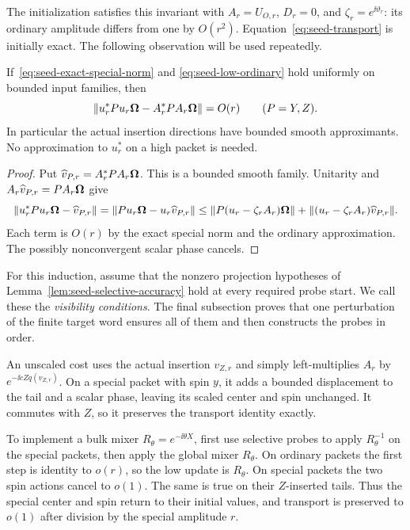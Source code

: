 The initialization satisfies this invariant with \(A_r=U_{O,r}\),
\(D_r=0\), and \(\zeta_r=e^{\ii\vartheta_r}\): its ordinary amplitude
differs from one by \(O(r^2)\).  Equation~\eqref{eq:seed-transport} is
initially exact.  The following observation will be used repeatedly.

\begin{lemma}
\label{lem:seed-low-insertions}
If~\eqref{eq:seed-exact-special-norm} and
\eqref{eq:seed-low-ordinary} hold uniformly on bounded input families,
then
\begin{equation}
\label{eq:seed-insertion-O-r}
 \lVert u_r^*Pu_r\boldsymbol\Omega-A_r^*PA_r\boldsymbol\Omega\rVert=O(r)
 \qquad(P=Y,Z).
\end{equation}
In particular the actual insertion directions have bounded smooth
approximants.  No approximation to \(u_r^*\) on a high packet is needed.
\end{lemma}

\begin{proof}
Put \(\widehat v_{P,r}=A_r^*PA_r\boldsymbol\Omega\).  This is a bounded smooth
family.  Unitarity and \(A_r\widehat v_{P,r}=PA_r\boldsymbol\Omega\) give
\[
 \lVert u_r^*Pu_r\boldsymbol\Omega-\widehat v_{P,r}\rVert
 =\lVert Pu_r\boldsymbol\Omega-u_r\widehat v_{P,r}\rVert
 \leq\lVert P(u_r-\zeta_rA_r)\boldsymbol\Omega\rVert
    +\lVert (u_r-\zeta_rA_r)\widehat v_{P,r}\rVert.
\]
Each term is \(O(r)\) by the exact special norm and the ordinary
approximation.  The possibly nonconvergent scalar phase cancels.
\end{proof}

For this induction, assume that the nonzero projection hypotheses of
Lemma~\ref{lem:seed-selective-accuracy} hold at every required probe
start.  We call these the \emph{visibility conditions}.  The final
subsection proves that one perturbation of the finite target word
ensures all of them and then constructs the probes in order.

An unscaled cost uses the actual insertion \(v_{Z,r}\) and simply
left-multiplies \(A_r\) by \(e^{-\ii cZq(v_{Z,r})}\).
On a special packet with spin \(y\), it adds a bounded displacement to
the tail and a scalar phase, leaving its scaled center and spin
unchanged.  It commutes with \(Z\), so it preserves the transport
identity exactly.

To implement a bulk mixer \(R_\theta=e^{-\ii\theta X}\), first use
selective probes to apply \(R_\theta^{-1}\) on the special packets,
then apply the global mixer \(R_\theta\).  On ordinary packets the
first step is identity to \(o(r)\), so the low update is \(R_\theta\).
On special packets the two spin actions cancel to \(o(1)\).  The same
is true on their \(Z\)-inserted tails.  Thus the special center and
spin return to their initial values, and transport is preserved to
\(o(1)\) after division by the special amplitude \(r\).

